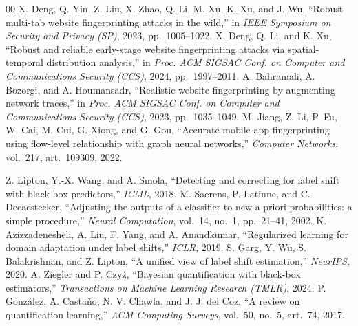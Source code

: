 \begin{thebibliography}{00}
 X. Deng, Q. Yin, Z. Liu, X. Zhao, Q. Li, M. Xu, K. Xu, and J. Wu, ``Robust multi-tab website fingerprinting attacks in the wild,'' in \textit{IEEE Symposium on Security and Privacy (SP)}, 2023, pp.~1005--1022.
 X. Deng, Q. Li, and K. Xu, ``Robust and reliable early-stage website fingerprinting attacks via spatial-temporal distribution analysis,'' in \textit{Proc. ACM SIGSAC Conf. on Computer and Communications Security (CCS)}, 2024, pp.~1997--2011.
 A. Bahramali, A. Bozorgi, and A. Houmansadr, ``Realistic website fingerprinting by augmenting network traces,'' in \textit{Proc. ACM SIGSAC Conf. on Computer and Communications Security (CCS)}, 2023, pp.~1035--1049.
 M. Jiang, Z. Li, P. Fu, W. Cai, M. Cui, G. Xiong, and G. Gou, ``Accurate mobile-app fingerprinting using flow-level relationship with graph neural networks,'' \textit{Computer Networks}, vol.~217, art.~109309, 2022.

 Z. Lipton, Y.-X. Wang, and A. Smola, ``Detecting and correcting for label shift with black box predictors,'' \textit{ICML}, 2018.
 M. Saerens, P. Latinne, and C. Decaestecker, ``Adjusting the outputs of a classifier to new a priori probabilities: a simple procedure,'' \textit{Neural Computation}, vol.~14, no.~1, pp.~21--41, 2002.
 K. Azizzadenesheli, A. Liu, F. Yang, and A. Anandkumar, ``Regularized learning for domain adaptation under label shifts,'' \textit{ICLR}, 2019. %
 S. Garg, Y. Wu, S. Balakrishnan, and Z. Lipton, ``A unified view of label shift estimation,'' \textit{NeurIPS}, 2020. %
 A. Ziegler and P. Czy\.{z}, ``Bayesian quantification with black-box estimators,'' \textit{Transactions on Machine Learning Research (TMLR)}, 2024.
 P. Gonz\'alez, A. Casta\~no, N. V. Chawla, and J. J. del Coz, ``A review on quantification learning,'' \textit{ACM Computing Surveys}, vol.~50, no.~5, art.~74, 2017.


\end{thebibliography}
